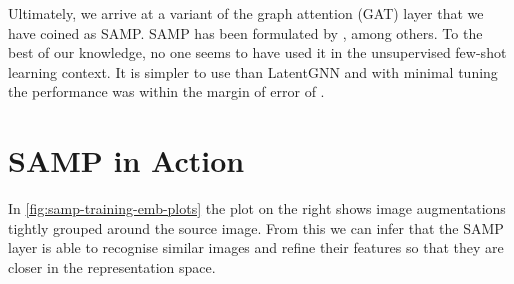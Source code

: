 Ultimately, we arrive at a variant of the graph attention (GAT) layer \parencite{velic018graph} that we have coined as SAMP. SAMP has been formulated by \parencite{brody2021attentive,seidenschwarz2021learning}, among others. To the best of our knowledge, no one seems to have used it in the unsupervised few-shot learning context. It is simpler to use than LatentGNN and with minimal tuning the performance was within the margin of error of \ccclr{}.

\section{SAMP in Action}\label{sec:samp-in-action}

In \cref{fig:samp-training-emb-plots} the plot on the right shows image augmentations tightly grouped around the source image. From this we can infer that the SAMP layer is able to recognise similar images and refine their features so that they are closer in the representation space.
